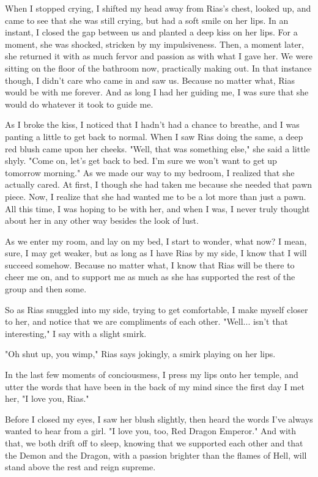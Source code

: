 \documentclass{article}
\begin{document}
When I stopped crying, I shifted my head away from Rias's chest, looked up, and came to see that she was still crying, but had a soft smile on her lips. In an instant, I closed the gap between us and planted a deep kiss on her lips. For a moment, she was shocked, stricken by my impulsiveness. Then, a moment later, she returned it with as much fervor and passion as with what I gave her. We were sitting on the floor of the bathroom now, practically making out. In that instance though, I didn't care who came in and saw us. Because no matter what, Rias would be with me forever. And as long I had her guiding me, I was sure that she would do whatever it took to guide me.

As I broke the kiss, I noticed that I hadn't had a chance to breathe, and I was panting a little to get back to normal. When I saw Rias doing the same, a deep red blush came upon her cheeks. "Well, that was something else," she said a little shyly. "Come on, let's get back to bed. I'm sure we won't want to get up tomorrow morning." As we made our way to my bedroom, I realized that she actually cared. At first, I though she had taken me because she needed that pawn piece. Now, I realize that she had wanted me to be a lot more than just a pawn. All this time, I was hoping to be with her, and when I was, I never truly thought about her in any other way besides the look of lust.

As we enter my room, and lay on my bed, I start to wonder, what now? I mean, sure, I may get weaker, but as long as I have Rias by my side, I know that I will succeed somehow. Because no matter what, I know that Rias will be there to cheer me on, and to support me as much as she has supported the rest of the group and then some.

So as Rias snuggled into my side, trying to get comfortable, I make myself closer to her, and notice that we are compliments of each other. "Well... isn't that interesting," I say with a slight smirk.

"Oh shut up, you wimp," Rias says jokingly, a smirk playing on her lips.

In the last few moments of conciousmess, I press my lips onto her temple, and utter the words that have been in the back of my mind since the first day I met her, "I love you, Rias."

Before I closed my eyes, I saw her blush slightly, then heard the words I've always wanted to hear from a girl. "I love you, too, Red Dragon Emperor." And with that, we both drift off to sleep, knowing that we supported each other and that the Demon and the Dragon, with a passion brighter than the flames of Hell, will stand above the rest and reign supreme.
\end{document}
